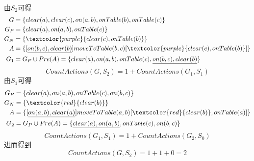 \documentclass[a4paper, 11pt]{article}
\begin{document}
\begin{answer}
\begin{itemize}
\begin{figure}[H]
    \end{figure}
    \\
    由$S_2$可得
    \[\begin{aligned}
        G&=\{clear(a),clear(c),on(a,b),onTable(b),onTable(c)\}\\
        G_P&=\{clear(a),on(a,b),onTable(c)\}\\
        G_N&=\{\textcolor{purple}{clear(c),onTable(b)}\}\\
        A&=\{[\underline{on(b,c),clear(b)}]moveToTable(b,c)[\textcolor{purple}{clear(c),onTable(b)}]\}\\
        G_1&=G_P\cup Pre(A)=\{clear(a),on(a,b),onTable(c),\underline{on(b,c),clear(b)}\}
    \end{aligned}\]
    \[CountActions(G,S_2)=1+CountActions(G_1,S_1)\]
    由$S_1$可得
    \[\begin{aligned}
        G_P&=\{clear(a),on(a,b),onTable(c),on(b,c)\}\\
        G_N&=\{\textcolor{red}{clear(b)}\}\\
        A&=\{[\underline{on(a,b),clear(a)}]moveToTable(a,b)[\textcolor{red}{clear(b)},onTable(a)]\}\\
        G_2&=G_P\cup Pre(A)=\{\underline{clear(a),on(a,b)},onTable(c),on(b,c)\}
    \end{aligned}\]
    \[CountActions(G_1,S_1)=1+CountActions(G_2,S_0)\]
    进而得到
    \[CountActions(G,S_2)=1+1+0=2\]
\end{itemize}
\end{answer}
\begin{flushleft}
\end{flushleft}

\newpage
\end{document}
